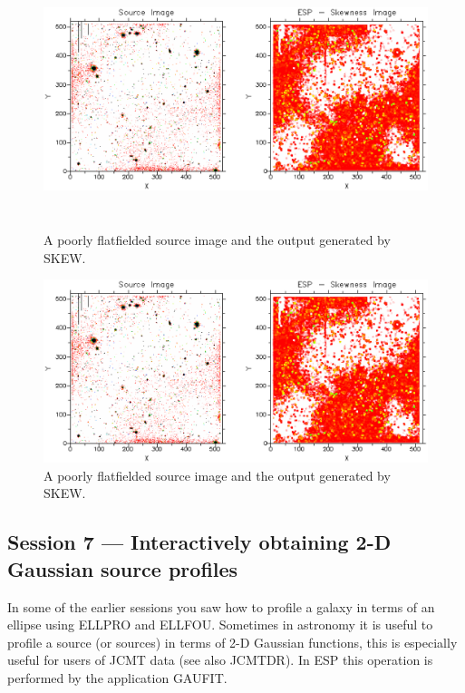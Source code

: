 \documentclass[twoside,11pt]{article}
\newenvironment{latexonly}{}{}
\newcommand{\xref}[3]{#1}
\newcommand{\xlabel}[1]{}
\begin{document}
\begin{latexonly}
\begin{figure}[htlb]
\centering 
\includegraphics[height=75mm,width=150mm]{sun180_diag6.eps}
\caption{A poorly flatfielded source image and the output generated by SKEW.}
\end{figure}
\end{latexonly}
\begin{htmlonly}
\begin{figure}[htlb]
\centering 
\includegraphics{sun180_diag6.eps}
\caption{A poorly flatfielded source image and the output generated by SKEW.}
\end{figure}
\end{htmlonly}

\subsection{Session 7 --- Interactively obtaining 2-D Gaussian source profiles}
\xlabel{SESSION7}
In some of the earlier sessions you saw how to profile a galaxy in
terms of an ellipse using ELLPRO and ELLFOU. Sometimes in astronomy
it is useful to profile a source (or sources) in terms of 2-D Gaussian 
functions, this is especially useful for users of JCMT data (see also
\xref{JCMTDR}{sun132}{}). In ESP this operation is performed by the
application GAUFIT. 
\end{document}
